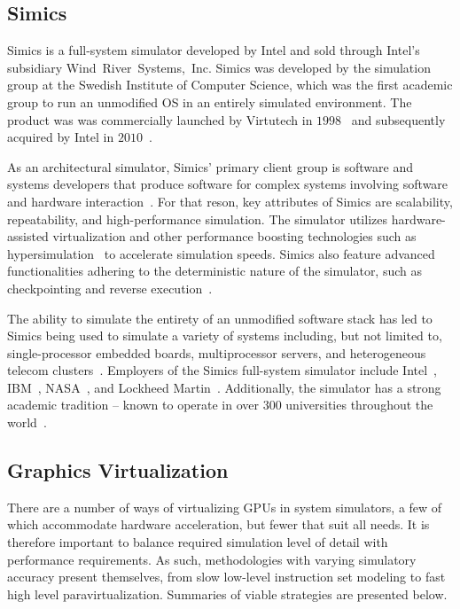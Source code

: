 \subsection{Simics}
\label{sec:simics}
Simics is a full-system simulator developed by Intel and sold through Intel's subsidiary Wind~River~Systems,~Inc.
Simics was developed by the simulation group at the Swedish Institute of Computer Science, which was the first academic group to run an unmodified OS in an entirely simulated environment.
The product was was commercially launched by Virtutech in $1998$~ and subsequently acquired by Intel in $2010$~.

As an architectural simulator, Simics' primary client group is software and systems developers that produce software for complex systems involving software and hardware interaction~.
For that reson, key attributes of Simics are scalability, repeatability, and high-performance simulation.
The simulator utilizes hardware-assisted virtualization and other performance boosting technologies such as hypersimulation~ to accelerate simulation speeds.
Simics also feature advanced functionalities adhering to the deterministic nature of the simulator, such as checkpointing and reverse execution~.

The ability to simulate the entirety of an unmodified software stack has led to Simics being used to simulate a variety of systems including, but not limited to, single-processor embedded boards, multiprocessor servers, and heterogeneous telecom clusters~.
Employers of the Simics full-system simulator include Intel~, IBM~, NASA~, and Lockheed Martin~.
Additionally, the simulator has a strong academic tradition -- known to operate in over $300$ universities throughout the world~.

\subsection{Graphics Virtualization}
\label{sec:previousresearch_graphicsvirtualization}
There are a number of ways of virtualizing GPUs in system simulators, a few of which accommodate hardware acceleration, but fewer that suit all needs.
It is therefore important to balance required simulation level of detail with performance requirements.
As such, methodologies with varying simulatory accuracy present themselves, from slow low-level instruction set modeling to fast high level paravirtualization.
Summaries of viable strategies are presented below.

